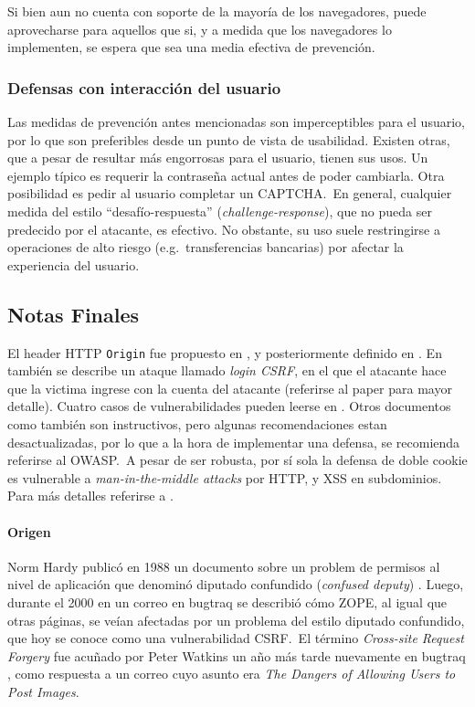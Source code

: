 \documentclass{article}
\theoremstyle{definition}
\begin{document}
Si bien aun no cuenta con soporte de la mayoría de los navegadores, puede
aprovecharse para aquellos que si, y a medida que los navegadores lo
implementen, se espera que sea una media efectiva de prevención.

\subsubsection{Defensas con interacción del usuario}
Las medidas de prevención antes mencionadas son imperceptibles para el usuario,
por lo que son preferibles desde un punto de vista de usabilidad. Existen otras,
que a pesar de resultar más engorrosas para el usuario, tienen sus usos. Un
ejemplo típico es requerir la contraseña actual antes de poder cambiarla. Otra
posibilidad es pedir al usuario completar un CAPTCHA.\ En general, cualquier
medida del estilo ``desafío-respuesta'' (\textit{challenge-response}), que no
pueda ser predecido por el atacante, es efectivo. No obstante, su uso suele
restringirse a operaciones de alto riesgo (e.g.\ transferencias bancarias) por afectar la
experiencia del usuario.

\subsection{Notas Finales}

El header HTTP \texttt{Origin} fue propuesto en \cite{Barth}, y posteriormente
definido en \cite{rfc6454}. En \cite{Barth} también se describe un ataque
llamado \textit{login CSRF}, en el que el atacante hace que la victima ingrese
con la cuenta del atacante (referirse al paper para mayor detalle).
Cuatro casos de vulnerabilidades pueden leerse en \cite{Zeller}.
Otros documentos como \cite{Burns,Blatz} también son instructivos, pero algunas
recomendaciones estan desactualizadas, por lo que a la hora de implementar una
defensa, se recomienda referirse al OWASP.\
A pesar de ser robusta, por sí sola la defensa de doble cookie es vulnerable a
\textit{man-in-the-middle attacks} por HTTP, y XSS en subdominios.  Para más
detalles referirse a \cite{Johansson}.

\paragraph{Origen} Norm Hardy publicó en 1988 un documento sobre un problem de
permisos al nivel de aplicación que denominó diputado confundido
(\textit{confused deputy}) \cite{Hardy}. Luego, durante el 2000 en un correo en
bugtraq \cite{bugtraq} se describió cómo ZOPE, al igual que otras páginas, se
veían afectadas por un problema del estilo diputado confundido, que hoy se
conoce como una vulnerabilidad CSRF.\ El término \textit{Cross-site Request Forgery} fue acuñado por Peter Watkins un año más tarde nuevamente en bugtraq
\cite{watkins}, como respuesta a un correo cuyo asunto era \textit{The Dangers of Allowing Users to Post Images}.


\end{document}
